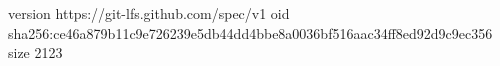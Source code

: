 version https://git-lfs.github.com/spec/v1
oid sha256:ce46a879b11c9e726239e5db44dd4bbe8a0036bf516aac34ff8ed92d9c9ec356
size 2123
